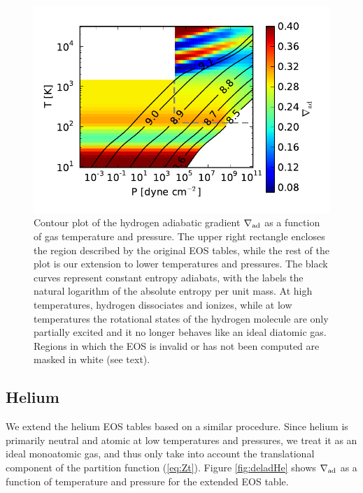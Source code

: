 \documentclass[apj]{emulateapj}
\newcommand{\delad}{\nabla_{\rm ad}}
\begin{document}
\begin{figure}[h!]
\centering
\includegraphics[scale=.8]{../../figs/ModelAtmospheres/RadSelfGravRealEOS/PaperFigs/delad_S_H.pdf}
\caption{Contour plot of the hydrogen adiabatic gradient $\delad$ as a function of gas temperature and pressure. The upper right rectangle encloses the region described by the original \citet{saumon95} EOS tables, while the rest of the plot is our extension to lower temperatures and pressures. The black curves represent constant entropy adiabats, with the labels the natural logarithm of the absolute entropy per unit mass. At high temperatures, hydrogen dissociates and ionizes, while at low temperatures the rotational states of the hydrogen molecule are only partially excited and it no longer behaves like an ideal diatomic gas. Regions in which the EOS is invalid or has not been computed are masked in white (see text).}
\label{fig:deladH}
\end{figure}

\subsection{Helium}

We extend the helium EOS tables based on a similar procedure. Since helium is primarily neutral and atomic at low temperatures and pressures, we treat it as an ideal monoatomic gas, and thus only take into account the translational component of the partition function (\ref{eq:Zt}). Figure \ref{fig:deladHe} shows $\delad$ as a function of temperature and pressure for the extended EOS table. %
\end{document}
